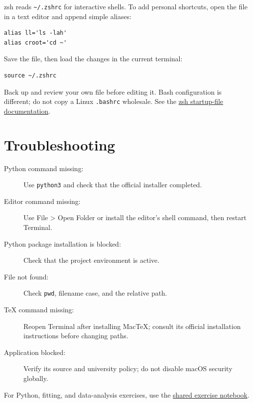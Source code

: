 \documentclass[11pt]{article}
\begin{document}
zsh reads \texttt{\textasciitilde/.zshrc} for interactive shells. To add
personal shortcuts, open the file in a text editor and append simple aliases:
\begin{lstlisting}
alias ll='ls -lah'
alias croot='cd ~'
\end{lstlisting}
Save the file, then load the changes in the current terminal:
\begin{lstlisting}
source ~/.zshrc
\end{lstlisting}
Back up and review your own file before editing it. Bash configuration is
different; do not copy a Linux \texttt{.bashrc} wholesale. See the
\href{https://zsh.sourceforge.io/Doc/Release/Files.html}{zsh startup-file
documentation}.

\section{Troubleshooting}
\begin{description}
\item[Python command missing:] Use \texttt{python3} and check that the
official installer completed.
\item[Editor command missing:] Use File > Open Folder or install the
editor's shell command, then restart Terminal.
\item[Python package installation is blocked:] Check that the project
environment is active.
\item[File not found:] Check \texttt{pwd}, filename case, and the relative path.
\item[TeX command missing:] Reopen Terminal after installing MacTeX; consult
its official installation instructions before changing paths.
\item[Application blocked:] Verify its source and university policy; do not
disable macOS security globally.
\end{description}

\noindent For Python, fitting, and data-analysis exercises, use the
\href{../Example_Code/Exersize.ipynb}{shared exercise notebook}.
\end{document}
